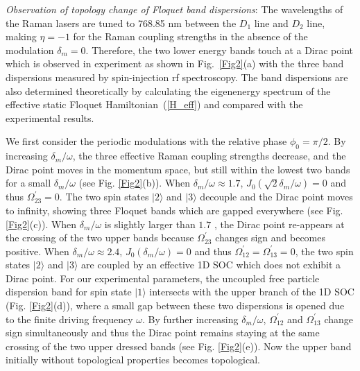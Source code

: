 \documentclass[aps,prl,twocolumn,floatfix,reprint]{revtex4}
\begin{document}
\emph{Observation of topology change of Floquet band dispersions}: The
wavelengths of the Raman lasers are tuned to 768.85 nm between the $D_{1}$
line and $D_{2}$ line, making $\eta =-1$ for the Raman coupling strengths in
the absence of the modulation $\delta _{m}=0$. Therefore, the two lower
energy bands touch at a Dirac point which is observed in experiment as shown
in Fig.~\ref{Fig2}(a) with the three band dispersions measured by
spin-injection rf spectroscopy. The band dispersions are also determined
theoretically by calculating the eigenenergy spectrum of the effective
static Floquet Hamiltonian~(\ref{H_eff}) and compared with the experimental
results.

We first consider the periodic modulations with the relative phase $\phi
_{0}=\pi /2$. By increasing $\delta _{m}/\omega $, the three effective Raman
coupling strengths decrease, and the Dirac point moves in the momentum
space, but still within the lowest two bands for a small $\delta _{m}/\omega
$ (see Fig. \ref{Fig2}(b)). When $\delta _{m}/\omega \approx 1.7$, $J_{0}(%
\sqrt{2}\delta _{m}/\omega )=0$ and thus $\Omega _{23}^{\prime }=0$. The two
spin states $|2\rangle $ and $|3\rangle $ decouple and the Dirac point moves
to infinity, showing three Floquet bands which are gapped everywhere (see
Fig. \ref{Fig2}(c)). When $\delta _{m}/\omega $ is slightly larger than $1.7$%
, the Dirac point re-appears at the crossing of the two upper bands because $%
\Omega _{23}^{\prime }$ changes sign and becomes positive. When $\delta
_{m}/\omega \approx 2.4$, $J_{0}(\delta _{m}/\omega )=0$ and thus $\Omega
_{12}^{\prime }=\Omega _{13}^{\prime }=0$, the two spin states $|2\rangle $
and $|3\rangle $ are coupled by an effective 1D SOC which does not exhibit a
Dirac point. For our experimental parameters, the uncoupled free particle
dispersion band for spin state $|1\rangle $ intersects with the upper branch
of the 1D SOC (Fig. \ref{Fig2}(d)), where a small gap between these two
dispersions is opened due to the finite driving frequency $\omega $. By
further increasing $\delta _{m}/\omega $, $\Omega _{12}^{\prime }$ and $%
\Omega _{13}^{\prime }$ change sign simultaneously and thus the Dirac point
remains staying at the same crossing of the two upper dressed bands (see
Fig. \ref{Fig2}(e)). Now the upper band initially without topological
properties becomes topological.
\end{document}
